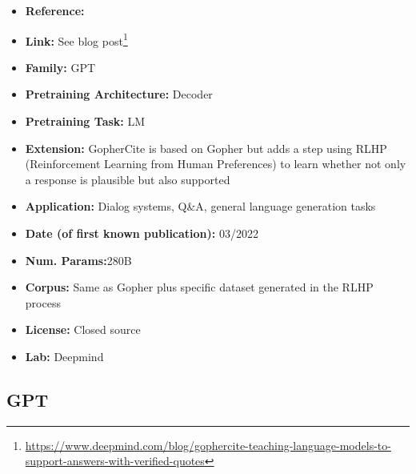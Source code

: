 \documentclass{article}
\begin{document}
            \begin{itemize}
                \item \textbf{Reference:} \href{https://arxiv.org/abs/2203.11147}{}
                \item \textbf{Link:} See blog post\footnote{\url{https://www.deepmind.com/blog/gophercite-teaching-language-models-to-support-answers-with-verified-quotes}}
                \item \textbf{Family:} GPT 
                \item \textbf{Pretraining Architecture:} Decoder
                \item \textbf{Pretraining Task:} LM
                \item \textbf{Extension:} GopherCite is based on Gopher but adds a step using RLHP (Reinforcement Learning from Human Preferences) to learn whether not only a response is plausible but also supported  
                \item \textbf{Application:} Dialog systems, Q\&A, general language generation tasks
                \item \textbf{Date (of first known publication):} 03/2022
                \item \textbf{Num. Params:}280B
                \item \textbf{Corpus:} Same as Gopher plus specific dataset generated in the RLHP process
                \item \textbf{License:} Closed source
                \item \textbf{Lab:} Deepmind
            \end{itemize}

\subsection{GPT}
\end{document}
